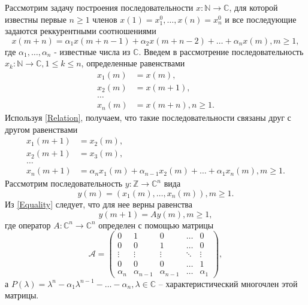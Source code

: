 Рассмотрим задачу построения последовательности $x : \mathbb{N} \rightarrow \mathbb{C}$, для которой известны первые $n \ge 1$ членов $x(1) = x_1^0, \dots, x(n) = x_n^0$ и все последующие задаются реккурентными соотношениями
\begin{equation}\label{Relation}
x(m+n) = \alpha_1 x(m+n-1) + \alpha_2 x(m+n-2) + \dots + \alpha_n x(m), m \ge 1,
\end{equation}
где $\alpha_1, \dots, \alpha_n$ - известные числа из $\mathbb{C}$.
Введем в рассмотрение последовательность $x_k : \mathbb{N} \rightarrow \mathbb{C}, 1 \le k \le n$, определенные равенствами
\begin{align*}
x_1(m) &= x(m), \\
x_2(m) &= x(m+1), \\
\dots \\
x_n(m) &= x(m+n), n \ge 1.
\end{align*}
Используя \eqref{Relation}, получаем, что такие последовательности связаны друг с другом равенствами
\begin{equation}\label{Equality}
\begin{aligned}
x_1(m+1) &= x_2(m), \\
x_2(m+1) &= x_3(m), \\
\dots \\
x_n(m+1) &= \alpha_n x_1(m) + \alpha_{n-1} x_2(m)+ \dots + \alpha_1 x_n(m), m \ge 1.
\end{aligned}
\end{equation}
Рассмотрим последовательность $y: \mathbb{Z} \rightarrow \mathbb{C}^n$ вида
$$
y(m) = (x_1(m), \dots, x_n(m)), m \ge 1.
$$
Из \eqref{Equality} следует, что для нее верны равенства 
\begin{equation}\label{Sequence}
y(m+1) = A y(m), m \ge 1,
\end{equation}
где оператор $A: \mathbb{C}^n \to \mathbb{C}^n$ определен с помощью матрицы 
$$
	\mathcal{A} = \begin{pmatrix}
		0 & 1 & 0 & \dots & 0 \\
		0 & 0 & 1 & \dots & 0 \\
		\vdots & \vdots & \vdots & \ddots & \vdots \\
		0 & 0 & 0 & \dots & 1 \\
		\alpha_n & \alpha_{n-1} & \alpha_{n-1} & \dots & \alpha_1
	\end{pmatrix},
$$
а $P(\lambda) = \lambda^{n} - \alpha_{1}\lambda^{n-1} - \ldots - \alpha_{n}, \lambda \in \mathbb{C}$ -- характеристический многочлен этой матрицы.